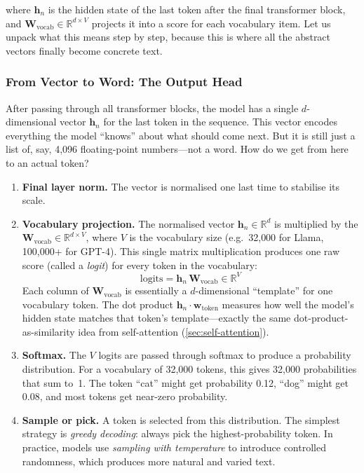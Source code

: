 where $\bm{h}_n$ is the hidden state of the last token after the
final transformer block, and $\bm{W}_{\text{vocab}} \in
\mathbb{R}^{d \times V}$ projects it into a score for each vocabulary
item. Let us unpack what this means step by step, because this is
where all the abstract vectors finally become concrete text.

\subsubsection{From Vector to Word: The Output Head}

After passing through all transformer blocks, the model has a single
$d$-dimensional vector $\bm{h}_n$ for the last token in the
sequence. This vector encodes everything the model ``knows'' about
what should come next. But it is still just a list of, say, 4{,}096
floating-point numbers---not a word. How do we get from here to an
actual token?

\begin{enumerate}[leftmargin=2em]
  \item \textbf{Final layer norm.} The vector is normalised one last
    time to stabilise its scale.

  \item \textbf{Vocabulary projection.} The normalised vector
    $\bm{h}_n \in \mathbb{R}^d$ is multiplied by the
     $\bm{W}_{\text{vocab}} \in
    \mathbb{R}^{d \times V}$, where $V$ is the vocabulary size
    (e.g.\ 32{,}000 for Llama, 100{,}000+ for GPT-4). This single
    matrix multiplication produces one raw score (called a
    \emph{logit}) for every token in the vocabulary:
    \[
      \text{logits} = \bm{h}_n \, \bm{W}_{\text{vocab}}
      \in \mathbb{R}^V
    \]
    Each column of $\bm{W}_{\text{vocab}}$ is essentially a
    $d$-dimensional ``template'' for one vocabulary token. The dot
    product $\bm{h}_n \cdot \bm{w}_{\text{token}}$ measures how
    well the model's hidden state matches that token's
    template---exactly the same dot-product-as-similarity idea from
    self-attention (\cref{sec:self-attention}).

  \item \textbf{Softmax.} The $V$ logits are passed through
    softmax to produce a probability distribution. For a vocabulary
    of 32{,}000 tokens, this gives 32{,}000 probabilities that sum
    to~1. The token ``cat'' might get probability 0.12, ``dog'' might
    get 0.08, and most tokens get near-zero probability.

  \item \textbf{Sample or pick.} A token is selected from this
    distribution. The simplest strategy is \emph{greedy decoding}:
    always pick the highest-probability token. In practice, models
    use \emph{sampling with temperature} to introduce controlled
    randomness, which produces more natural and varied text.
\end{enumerate}

